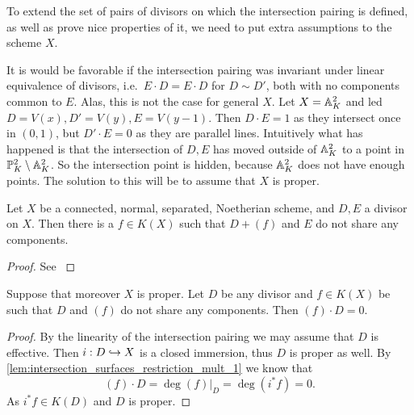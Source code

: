 To extend the set of pairs of divisors on which the intersection pairing is defined, as well as prove nice properties of it, we need to put extra assumptions to the scheme $X$. 
\begin{example}\label{ex:fail_intersection_pairing_linear}
	It is would be favorable if the intersection pairing was invariant under linear equivalence of divisors, i.e.\ $E\cdot D = E\cdot D$ for $D \sim D'$, both with no components common to $E$. 
	Alas, this is not the case for general $X$. 
	Let $X = \mathbb{A}_K^{2}$ and led $D = V(x), D' = V(y), E = V(y-1)$. 
	Then $D\cdot E = 1$ as they intersect once in $(0, 1)$, but $D' \cdot E = 0$ as they are parallel lines. 
	Intuitively what has happened is that the intersection of $D, E$ has moved outside of $\mathbb{A}_K^2$ to a point in $\mathbb{P}^{2}_K \setminus \mathbb{A}_{K}^2$. 
	So the intersection point is hidden, because $\mathbb{A}_K^2$ does not have enough points. 
	The solution to this will be to assume that $X$ is proper. 
\end{example}


\begin{lemma}\label{lem:moving_lemma}
	Let $X$ be a connected, normal, separated, Noetherian scheme, and $D, E$ a divisor on $X$. 
	Then there is a $f \in K(X)$ such that $D + (f)$ and $E$ do not share any components. 
\end{lemma}
\begin{proof}
	See \cite[cor.\ 9.1.10]{liuAlgebraicGeometryArithmetic2002}
\end{proof}

\begin{lemma}\label{lem:proper_trivial_bundle_pairing}
	Suppose that moreover $X$ is proper. 
	Let  $D$ be any divisor and $f \in K(X)$ be such that $D$ and $(f)$ do not share any components. 
	Then $(f)\cdot D = 0$. 
\end{lemma}
\begin{proof}
	By the linearity of the intersection pairing we may assume that $D$ is effective. 
	Then $ i: D \hookrightarrow X$ is a closed immersion, thus $D$ is proper as well. By \cref{lem:intersection_surfaces_restriction_mult_1} we know that \[
		(f)\cdot D = \deg (f)|_D = \deg (i^* f) = 0
	.\] 
	As $i^* f \in K(D)$ and $D$ is proper. 
\end{proof}

